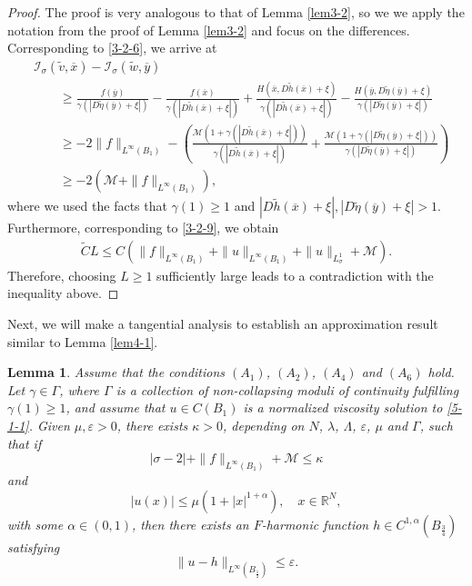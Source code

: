\documentclass[11pt,reqno]{amsart}
\numberwithin{equation}{section}
\newtheorem{lemma}[theorem]{Lemma}
\begin{document}
\begin{proof}
The proof is very analogous to that of Lemma \ref{lem3-2}, so we we apply the notation from the proof of Lemma \ref{lem3-2} and focus on the differences.
Corresponding to \eqref{3-2-6}, we arrive at
\begin{align*}
&\mathcal{I}_\sigma(\widetilde{v},\overline{x})-\mathcal{I}_\sigma(\widetilde{w},\overline{y}) \\
&\qquad\ge \frac{f(\overline{y})}{\gamma(|D\widetilde{\eta}(\overline{y})+\xi|)}-\frac{f(\overline{x})}{\gamma(|D\widetilde{h}(\overline{x})+\xi|)}
+\frac{H(\overline{x},D\widetilde{h}(\overline{x})+\xi)}{\gamma(|D\widetilde{h}(\overline{x})+\xi|)}-
\frac{H(\overline{y},D\widetilde{\eta}(\overline{y})+\xi)}{\gamma(|D\widetilde{\eta}(\overline{y})+\xi|)}\\
&\qquad\ge-2\|f\|_{L^\infty(B_1)}-\left(\frac{\mathcal{M}(1+\gamma(|D\widetilde{h}(\overline{x})+\xi|))}{\gamma(|D\widetilde{h}(\overline{x})+\xi|)}+
\frac{\mathcal{M}(1+\gamma(|D\widetilde{\eta}(\overline{y})+\xi|))}{\gamma(|D\widetilde{\eta}(\overline{y})+\xi|)}\right) \\
&\qquad\ge-2(\mathcal{M}+\|f\|_{L^\infty(B_1)}),
\end{align*}
where we used the facts that $\gamma(1)\ge1$ and $|D\widetilde{h}(\overline{x})+\xi|,|D\widetilde{\eta}(\overline{y})+\xi|>1$.
Furthermore, corresponding to \eqref{3-2-9}, we obtain
\begin{align*}
\widetilde{C}L\le C(\|f\|_{L^\infty(B_1)}+\|u\|_{L^\infty(B_1)}+\|u\|_{L^1_\sigma}+\mathcal{M}).
\end{align*}
Therefore, choosing $L\ge1$ sufficiently large leads to a contradiction with the inequality above.
\end{proof}

Next, we will make a tangential analysis to establish an approximation result similar to Lemma \ref{lem4-1}.

\begin{lemma}
\label{lem5-2}
Assume that the conditions $(A_1)$, $(A_2)$, $(A_4)$ and $(A_6)$ hold. Let $\gamma\in \Gamma$, where $\Gamma$ is a collection of non-collapsing moduli of continuity fulfilling $\gamma(1)\ge1$,
and assume that $u\in C(B_1)$ is a normalized viscosity solution to \eqref{5-1-1}. Given $\mu,\varepsilon>0$, there exists $\kappa>0$,
depending on $N$, $\lambda$, $\Lambda$, $\varepsilon$, $\mu$ and $\Gamma$, such that if
$$
|\sigma-2|+\|f\|_{L^\infty(B_1)}+\mathcal{M}\leq \kappa
$$
and
$$
|u(x)|\le\mu(1+|x|^{1+\alpha}), \quad  x\in\mathbb{R}^N,
$$
with some $\alpha\in(0,1)$, then there exists an $F$-harmonic function $h\in C^{1,\alpha}(B_{\frac34})$ satisfying
$$
\|u-h\|_{L^\infty(B_{\frac12})}\leq \varepsilon.
$$
\end{lemma}
\end{document}
